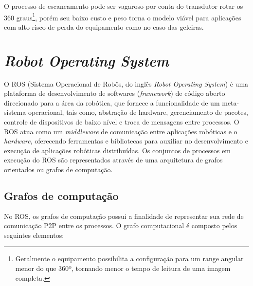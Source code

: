 O processo de escaneamento pode ser vagaroso por conta do transdutor rotar os 360 graus\footnote{Geralmente o equipamento possibilita a configuração para um range angular menor do que 360º, tornando menor o tempo de leitura de uma imagem completa.}, porém seu baixo custo e peso torna o modelo viável para aplicações com alto risco de perda do equipamento como no caso das geleiras.


\section{\textit{Robot Operating System}}
\label{sec:ros}

O ROS (Sistema Operacional de Robôs, do inglês \textit{Robot Operating System}) é uma plataforma de desenvolvimento de softwares (\textit{framework}) de código aberto direcionado para a área da robótica, que fornece a funcionalidade de um meta-sistema operacional, tais como, abstração de hardware, gerenciamento de pacotes, controle de dispositivos de baixo nível e troca de mensagens entre processos. 
O ROS atua como um \textit{middleware} de comunicação entre aplicações robóticas e o \textit{hardware}, oferecendo ferramentas e bibliotecas para auxiliar no desenvolvimento e execução de aplicações robóticas distribuídas. Os conjuntos de processos em execução do ROS são representados através de uma arquitetura de grafos orientados ou grafos de computação.

\subsection{Grafos de computação}

No ROS, os grafos de computação possui a finalidade de representar sua rede de comunicação P2P entre os processos. O grafo computacional é composto pelos seguintes elementos:

